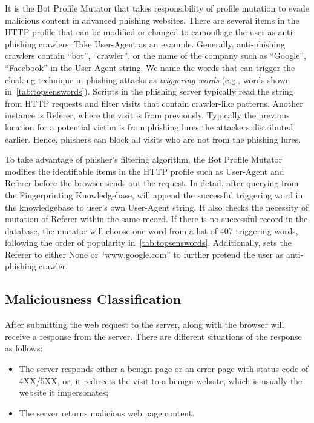 It is the Bot Profile Mutator that takes responsibility of profile mutation to evade malicious content in advanced phishing websites.
There are several items in the HTTP profile that can be modified or changed to camouflage the user as anti-phishing crawlers.
Take User-Agent as an example. 
Generally, anti-phishing crawlers contain ``bot'', ``crawler'', or the name of the company such as ``Google'', ``Facebook'' in the User-Agent string.
We name the words that can trigger the cloaking technique in phishing attacks as \emph{triggering words} (e.g., words shown in~\autoref{tab:topsenswords}).
Scripts in the phishing server typically read the string from HTTP requests and filter visits that contain crawler-like patterns.
Another instance is Referer, where the visit is from previously.
Typically the previous location for a potential victim is from phishing lures the attackers distributed earlier.
Hence, phishers can block all visits who are not from the phishing lures.

To take advantage of phisher's filtering algorithm, the Bot Profile Mutator modifies the identifiable items in the HTTP profile such as User-Agent and Referer before the browser sends out the request.
In detail, after querying from the Fingerprinting Knowledgebase, \spartacus will append the successful triggering word in the knowledgebase to user's own User-Agent string.
It also checks the necessity of mutation of Referer within the same record.
If there is no successful record in the database,
the mutator will choose one word from a list of 407 triggering words, following the order of popularity in~\autoref{tab:topsenswords}.
Additionally, \spartacus sets the Referer to either None or ``www.google.com'' to further pretend the user as anti-phishing crawler.


\subsection{Maliciousness Classification}
After submitting the web request to the server, \spartacus along with the browser will receive a response from the server.
There are different situations of the response as follows:

\begin{itemize}
    \item The server responds either a benign page or an error page with status code of 4XX/5XX, or, it redirects the visit to a benign website, which is usually the website it impersonates;
    \item The server returns malicious web page content.
\end{itemize}


